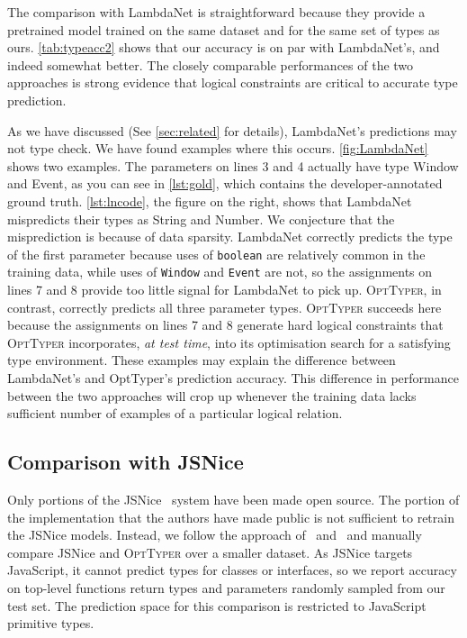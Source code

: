 \documentclass[acmsmall, review, anonymous]{acmart}\settopmatter{printfolios=true,printccs=false,printacmref=false}
\newcommand{\projectname}{\textsc{OptTyper}\xspace}
\begin{document}
The comparison with LambdaNet is straightforward because they provide a pretrained model trained on the same dataset and for the same set of types as ours. 
\cref{tab:typeacc2} shows that our accuracy is on par with LambdaNet's, and indeed somewhat better.
The closely comparable performances of the two approaches is strong evidence that logical constraints are critical to accurate type prediction. 

As we have discussed (See \cref{sec:related} for details), 
LambdaNet's predictions may not type check.  We have found examples where this occurs. \cref{fig:LambdaNet} shows two examples.  
The parameters on lines 3 and 4 actually have type Window and Event, as you can see in \cref{lst:gold}, which contains the developer-annotated ground truth.
\cref{lst:lncode}, the figure on the right, shows that LambdaNet mispredicts their types as String and Number.
%
We conjecture that the misprediction is because of data sparsity.
%
LambdaNet correctly predicts the type of the first parameter because uses of \texttt{boolean} are relatively common in the training data, while uses of \texttt{Window} and \texttt{Event} are not, so the assignments on lines 7 and 8 provide too little signal for LambdaNet to pick up.
\projectname, in contrast, correctly predicts all three parameter types.
\projectname succeeds here because the assignments on lines 7 and 8 generate hard logical constraints that \projectname incorporates, \emph{at test time}, into its optimisation search for a satisfying type environment.
These examples may explain the difference between LambdaNet's and OptTyper's prediction accuracy. 
This difference in performance between the two approaches will crop up whenever the training data lacks sufficient number of examples of a particular logical relation.


\subsection{Comparison with JSNice}
Only portions of the JSNice~\cite{raychev15} system have been made open source. 
The portion of the implementation that the authors have made public is not sufficient to retrain the JSNice models. 
Instead, we follow the approach of~\citet{hellendoorn18} and~\citet{wei20} and manually compare JSNice and \projectname over a smaller dataset. 
As JSNice targets JavaScript, it cannot predict types for classes or interfaces, so we report accuracy on top-level functions return types and parameters randomly sampled from our test set. The prediction
space for this comparison is restricted to JavaScript primitive types.
\end{document}
